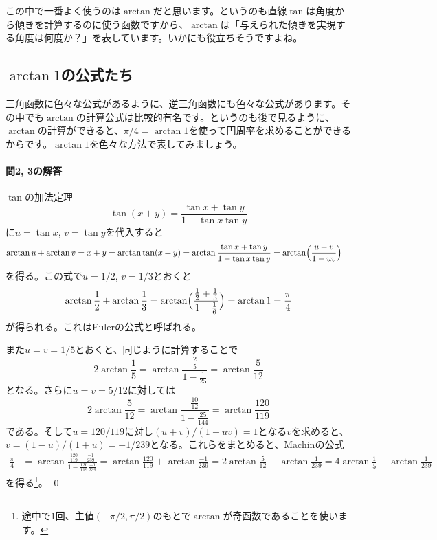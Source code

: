 この中で一番よく使うのは$\arctan$だと思います。というのも直線$\tan$は角度から傾きを計算するのに使う函数ですから、$\arctan$は「与えられた傾きを実現する角度は何度か？」を表しています。いかにも役立ちそうですよね。

\subsection{$\arctan 1$の公式たち}

三角函数に色々な公式があるように、逆三角函数にも色々な公式があります。その中でも$\arctan$の計算公式は比較的有名です。というのも後で見るように、$\arctan$の計算ができると、$\pi/4 = \arctan 1$を使って円周率を求めることができるからです。$\arctan 1$を色々な方法で表してみましょう。

\paragraph{問2, 3の解答} $\tan$の加法定理
\[
\tan(x+y) = \frac{\tan x + \tan y}{1 - \tan x\tan y}
\]
に$u=\tan x$, $v=\tan y$を代入すると
\begin{align*}
\arctan u + \arctan v
&= x + y = \arctan \tan(x+y)
= \arctan \frac{\tan x + \tan y}{1 - \tan x\tan y}
= \arctan \Bigl(\frac{u+v}{1-uv}\Bigr)
\end{align*}
を得る。この式で$u=1/2$, $v=1/3$とおくと
\[
\arctan \frac{1}{2} + \arctan \frac{1}{3} = \arctan \Bigl(\frac{\frac{1}{2}+\frac{1}{3}}{1-\frac{1}{6}}\Bigr) = \arctan 1 = \frac{\pi}{4}
\]
が得られる。これはEulerの公式と呼ばれる。

また$u=v=1/5$とおくと、同じように計算することで
\[
2\arctan\frac{1}{5} = \arctan\frac{\frac{2}{5}}{1-\frac{1}{25}} = \arctan\frac{5}{12}
\]
となる。さらに$u=v=5/12$に対しては
\[
2\arctan\frac{5}{12} = \arctan\frac{\frac{10}{12}}{1-\frac{25}{144}} = \arctan\frac{120}{119}
\]
である。そして$u=120/119$に対し$(u+v)/(1-uv)=1$となる$v$を求めると、$v=(1-u)/(1+u)=-1/239$となる。これらをまとめると、Machinの公式
\begin{align*}
\frac{\pi}{4}
&= \arctan \frac{\frac{120}{119}+\frac{-1}{239}}{1-\frac{120}{119}\frac{-1}{239}}
= \arctan \frac{120}{119} + \arctan\frac{-1}{239}
= 2\arctan\frac{5}{12} - \arctan\frac{1}{239}
= 4\arctan\frac{1}{5} - \arctan\frac{1}{239}
\end{align*}
を得る\footnote{途中で$1$回、主値$(-\pi/2,\pi/2)$のもとで$\arctan$が奇函数であることを使います。}。 \qed

